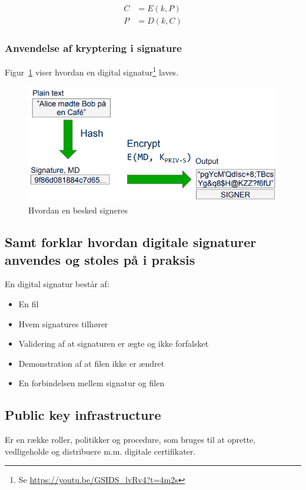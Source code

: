 \begin{align}
	C &= E(k,P)\\
	P &= D(k,C)
\end{align}



\subsubsection{Anvendelse af kryptering i signature}
Figur~\ref{fig:digital-signature} viser hvordan en digital signatur\footnote{Se \url{https://youtu.be/GSIDS_lvRv4?t=4m2s}} laves.

\begin{figure}[H]
	\centering
	\includegraphics[width=0.7\linewidth]{figs/spm5/digital-signature}
	\caption{Hvordan en besked signeres}
	\label{fig:digital-signature}
\end{figure}

\subsection{Samt forklar hvordan digitale signaturer anvendes og stoles på i praksis}
En digital signatur består af:

\begin{itemize}
	\item En fil
	\item Hvem signatures tilhører
	\item Validering af at signaturen er ægte og ikke forfalsket
	\item Demonstration af at filen ikke er ændret
	\item En forbindelsen mellem signatur og filen
\end{itemize}

\subsection{Public key infrastructure}
Er en række roller, politikker og procedure, som bruges til at oprette, vedligeholde og distribuere m.m. digitale certifikater.

